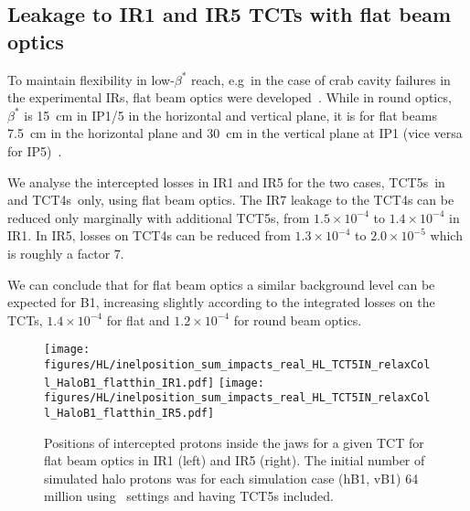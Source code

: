\subsection{Leakage to IR1 and IR5 TCTs with flat beam optics}

To maintain flexibility in low-$\beta^*$ reach, e.g~in the case of crab cavity failures in the experimental IRs, flat beam optics were developed~\cite{}. While in round optics, $\beta^*$ is 15~cm in IP1/5 in the horizontal and vertical plane, it is for flat beams 7.5~cm in the horizontal plane and 30~cm in the vertical plane at IP1 (vice versa for IP5)~\cite{opticsWebRef}. 

We analyse the intercepted losses in IR1 and IR5 for the two cases, TCT5s~in and TCT4s~only, using flat beam optics. The IR7 leakage to the TCT4s can be reduced only marginally with additional TCT5s, from $1.5 \times 10^{-4}$ to $1.4 \times 10^{-4}$ in IR1. In IR5, losses on TCT4s can be reduced from $1.3 \times 10^{-4}$ to $2.0 \times 10^{-5}$ which is roughly a factor 7. 

We can conclude that for flat beam optics a similar background level can be expected for B1, increasing slightly according to the integrated losses on the TCTs, $1.4 \times 10^{-4}$ for flat and $1.2 \times 10^{-4}$ for round beam optics.




\begin{figure}%
\begin{center}
  \texttt{[image: figures/HL/inelposition\_sum\_impacts\_real\_HL\_TCT5IN\_relaxColl\_HaloB1\_flatthin\_IR1.pdf]}
  \texttt{[image: figures/HL/inelposition\_sum\_impacts\_real\_HL\_TCT5IN\_relaxColl\_HaloB1\_flatthin\_IR5.pdf]}
\end{center}
 \caption{Positions of intercepted protons inside the jaws for a given TCT for flat beam optics in IR1 (left) and IR5 (right). The initial number of simulated halo protons was for each simulation case (hB1, vB1) 64 million using \twosigmaret~settings and having TCT5s included.
   \label{fig:inelflat}}
\end{figure}
